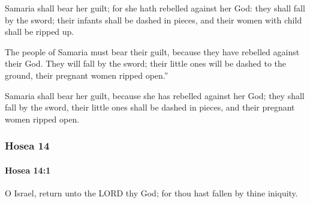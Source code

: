 			\begin{versebox}
					\item[BHS] 
					\item[LXX] 
					\item[ASV] Samaria shall bear her guilt; for she hath rebelled against her God: they shall fall by the sword; their infants shall be dashed in pieces, and their women with child shall be ripped up.
					\item[NIV] The people of Samaria must bear their guilt, because they have rebelled against their God. They will fall by the sword; their little ones will be dashed to the ground, their pregnant women ripped open.”
					\item[NRSV] Samaria shall bear her guilt, because she has rebelled against her God; they shall fall by the sword, their little ones shall be dashed in pieces, and their pregnant women ripped open.
			\end{versebox}
	\subsubsection{Hosea 14} %
		\label{HOSEA-14}

		\paragraph{Hosea 14:1} %
			\label{HOSEA-14-1}

			O Israel, return unto the LORD thy God; for thou hast fallen by thine iniquity.

